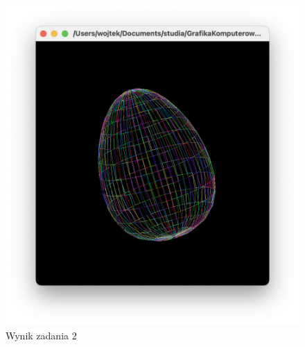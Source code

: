 \documentclass[]{article}
\begin{document}
\begin{figure}[H]
	\centering
	\includegraphics[width=\textwidth]{zad2.png}
	\caption{Wynik zadania 2}
\end{figure}
\end{document}
